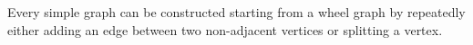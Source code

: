 \documentclass[12pt]{article}
\begin{document}
Every  simple graph can be constructed starting from a wheel graph by repeatedly either adding an edge between two non-adjacent vertices or splitting a vertex.
\end{document}
